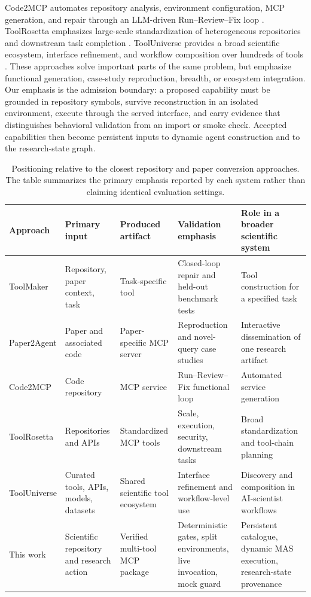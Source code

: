 \documentclass[letterpaper]{article} %
\begin{document}
Code2MCP automates repository analysis, environment configuration, MCP generation, and repair through an LLM-driven Run--Review--Fix loop \citep{ouyang2025code2mcp}. ToolRosetta emphasizes large-scale standardization of heterogeneous repositories and downstream task completion \citep{di2026toolrosetta}. ToolUniverse provides a broad scientific ecosystem, interface refinement, and workflow composition over hundreds of tools \citep{gao2025tooluniverse}. These approaches solve important parts of the same problem, but emphasize functional generation, case-study reproduction, breadth, or ecosystem integration. Our emphasis is the admission boundary: a proposed capability must be grounded in repository symbols, survive reconstruction in an isolated environment, execute through the served interface, and carry evidence that distinguishes behavioral validation from an import or smoke check. Accepted capabilities then become persistent inputs to dynamic agent construction and to the research-state graph.

\begin{table}[t]
\centering
\small
\caption{Positioning relative to the closest repository and paper conversion approaches. The table summarizes the primary emphasis reported by each system rather than claiming identical evaluation settings.}
\label{tab:related}
\begin{tabular}{p{2.1cm}p{2.3cm}p{2.4cm}p{3.3cm}p{3.4cm}}
\toprule
Approach & Primary input & Produced artifact & Validation emphasis & Role in a broader scientific system \\
\midrule
ToolMaker & Repository, paper context, task & Task-specific tool & Closed-loop repair and held-out benchmark tests & Tool construction for a specified task \\
Paper2Agent & Paper and associated code & Paper-specific MCP server & Reproduction and novel-query case studies & Interactive dissemination of one research artifact \\
Code2MCP & Code repository & MCP service & Run--Review--Fix functional loop & Automated service generation \\
ToolRosetta & Repositories and APIs & Standardized MCP tools & Scale, execution, security, downstream tasks & Broad standardization and tool-chain planning \\
ToolUniverse & Curated tools, APIs, models, datasets & Shared scientific tool ecosystem & Interface refinement and workflow-level use & Discovery and composition in AI-scientist workflows \\
This work & Scientific repository and research action & Verified multi-tool MCP package & Deterministic gates, split environments, live invocation, mock guard & Persistent catalogue, dynamic MAS execution, research-state provenance \\
\bottomrule
\end{tabular}
\end{table}
\end{document}
